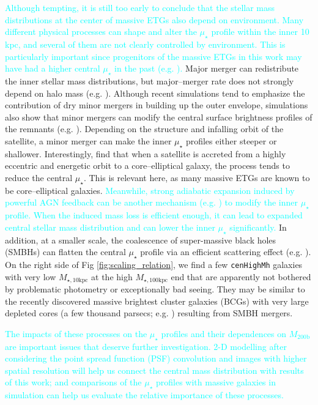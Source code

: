 \documentclass[a4paper,fleqn,usenatbib]{mnras}
\def\rbcg{\texttt{cenHighMh}}
\def\mhalo{{$M_{\mathrm{200b}}$}}
\def\minn{{$M_{\star,10\mathrm{kpc}}$}}
\def\mtot{{$M_{\star,100\mathrm{kpc}}$}}
\def\mden{{$\mu_{\star}$}}
\newcommand{\song}[1]{\textcolor{cyan}{#1}}
\begin{document}
    \song{ 
    Although tempting, it is still too early to conclude that the stellar mass 
    distributions at the center of massive ETGs also depend on environment. 
    Many different physical processes can shape and alter the \mden{} profile within 
    the inner 10 kpc, and several of them are not clearly controlled by environment.
    This is particularly important since progenitors of the massive ETGs in this 
    work may have had a higher central \mden{} in the past
    (e.g. \citealt{Szomoru2012}).
    } 
    Major merger can redistribute the inner stellar mass distributions, but 
    major--merger rate does not strongly depend on halo mass 
    (e.g. \citealt{Shankar2014}). 
    Although recent simulations tend to emphasize the contribution of dry minor 
    mergers in building up the outer envelope, simulations also show that minor 
    mergers can modify the central surface brightness profiles of the remnants
    (e.g. \citealt{BoylanKolchin2007}). 
    Depending on the structure and infalling orbit of the satellite, a minor merger 
    can make the inner \mden{} profiles either steeper or shallower.  
    Interestingly, \citet{BoylanKolchin2007} find that when a satellite is accreted 
    from a highly eccentric and energetic orbit to a core--elliptical galaxy, the 
    process tends to reduce the central \mden{}.  
    This is relevant here, as many massive ETGs are known to be core--elliptical 
    galaxies. 
    \song{
    Meanwhile, strong adiabatic expansion induced by powerful AGN feedback can 
    be another mechanism (e.g. \citealt{Fan2008}) to modify the inner \mden{}
    profile.
    When the induced mass loss is efficient enough, it can lead to expanded 
    central stellar mass distribution and can lower the inner \mden{} significantly. 
    } 
    In addition, at a smaller scale, the coalescence of super-massive black holes 
    (SMBHs) can flatten the central \mden{} profile via an efficient scattering 
    effect (e.g. \citealt{Milosavljevi2002}).
    On the right side of Fig \ref{fig:scaling_relation}, we find a few \rbcg{} 
    galaxies with very low \minn{} at the high \mtot{} end that are apparently not 
    bothered by problematic photometry or exceptionally bad seeing.  
    They may be similar to the recently discovered massive brightest cluster galaxies 
    (BCGs) with very large depleted cores (a few thousand parsecs; e.g. 
    \citealt{Postman2012, LopezCruz2014, Thomas2016, Bonfini2016}) resulting from 
    SMBH mergers.
    
    \song{
    The impacts of these processes on the \mden{} profiles and their dependences 
    on \mhalo{} are important issues that deserve further investigation.  
    2-D modelling after considering the point spread function (PSF) convolution and 
    images with higher spatial resolution will help us connect the central mass 
    distribution with results of this work; and comparisons of the \mden{} profiles 
    with massive galaxies in simulation can help us evaluate the relative importance 
    of these processes.
    }
\end{document}
